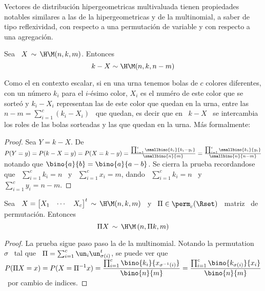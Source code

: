 
Vectores  de  distribuci\'on  hipergeometricas multivaluada  tienen  propiedades
notables similares a las de la  hipergeometricas y de la multinomial, a saber de
tipo reflexividad, con respecto a una permutaci\'on de variable y con respecto a
una agregaci\'on.
%
\begin{lema}[Reflexividad]
\label{Lem:MP:ReflexividadHipergeomMulti}
%
  Sea \ $X \, \sim \, \H\M(n,k,m)$. Entonces
  \[
  k-X \sim \H\M(n,k,n-m)
  \]
\end{lema}
%
Como  el en  contexto  escalar, si  en una  urna  tenemos bolas  de $c$  colores
diferentes,  con  un n\'umero  $k_i$  para el  $i$-\'esimo  color,  $X_i$ es  el
num\'ero de este color que se sorte\'o y $k_i-X_i$ representan las de este color
que quedan en la urna, entre las  \ $n-m = \sum_{i=1}^c (k_i-X_i)$ \ que quedan,
es decir que en \ $k-X$ \ se  intercambia los roles de las bolas sorteadas y las
que quedan en la urna. M\'as formalmente:
%
\begin{proof}
  Sea $Y =  k-X$. De $P(Y = y) =  P(k-X = y) = P(X  = k-y) = \frac{\prod_{i=1}^c
    \smallbino{k_i}{k_i-y_i}}{\smallbino{n}{m}}       =      \frac{\prod_{i=1}^c
    \smallbino{k_i}{y_i}}{\smallbino{n}{n-m}}$   notando   que  $\bino{a}{b}   =
  \bino{a}{a-b}$. Se cierra la prueba  recordandose que \ $\sum_{i=1}^c k_i = n$
  \  y  \ $\sum_{i=1}^c  x_i  =  m$,  dando \  $\sum_{i=1}^c  k_i  =  n$ \  y  \
  $\sum_{i=1}^c y_i = n-m$.
\end{proof}
%
\begin{lema}\label{Lem:MP:PermutacionHipergeomMulti}
%
  Sea  \ $X =  \begin{bmatrix} X_1  & \cdots  & X_c  \end{bmatrix}^t \,  \sim \,
  \H\M(n,k,m)$  \   y  \   $\Pi  \in  \perm_c(\Rset)$   \  matriz   \  de
  permutaci\'on. Entonces
  \[
  \Pi X \, \sim \, \H\M\left( n ,  \Pi k , m \right)
  \]
\end{lema}
%
\begin{proof}
  La  prueba sigue  paso paso  la de  la multinomial.  Notando la  permutation \
  $\sigma$ \  tal que \ $\Pi  = \sum_{i=1}^c \un_i  \un_{\sigma(i)}^t$, se puede
  ver   que  \  $\displaystyle   P(\Pi  X   =  x)   =  P(X   =  \Pi^{-1}   x)  =
  \frac{\prod_{i=1}^c       \bino{k_i}{x_{\sigma^{-1}(i)}}}{\bino{n}{m}}       =
  \frac{\prod_{i=1}^c \bino{k_{\sigma(i)}}{x_i}}{\bino{n}{m}} $  \ por cambio de
  indices.
\end{proof}
